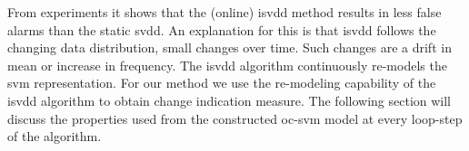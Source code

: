 From experiments it shows that the (online) \gls{isvdd} method results in less false alarms than the static \gls{svdd}.
An explanation for this is that \gls{isvdd} follows the changing data distribution, \ie small changes over time.
Such changes are a drift in mean or increase in frequency.
The \gls{isvdd} algorithm continuously re-models the \gls{svm} representation.
For our method we use the re-modeling capability of the \gls{isvdd} algorithm to obtain change indication measure.
The following section will discuss the properties used from the constructed \gls{oc-svm} model at every loop-step of the algorithm.

